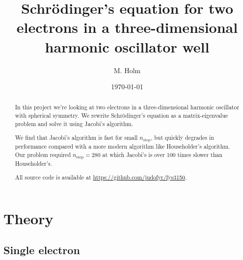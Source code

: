 \documentclass[a4paper]{revtex4}
\begin{document}
\newcommand{\se}{Schr\"{o}dinger}

\title{\se's equation for two electrons in a three-dimensional harmonic oscillator well}
\author{M. Holm}
\noaffiliation

\date{\today}

\begin{abstract}
  In this project we're looking at two electrons in a three-dimensional
  harmonic oscillator with spherical symmetry. We rewrite \se's equation as a
  matrix-eigenvalue problem and solve it using Jacobi's algorithm.

  We find that Jacobi's algorithm is fast for small $n_\text{step}$, but
  quickly degrades in performance compared with a more modern algorithm like
  Householder's algorithm. Our problem required $n_\text{step} = 280$ at which
  Jacobi's is over 100 times slower than Householder's.

  All source code is available at \url{https://github.com/judofyr/fys3150}.
\end{abstract}

\maketitle

\section{Theory}

\subsection{Single electron}
\label{seq:one}
\end{document}
